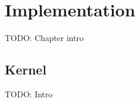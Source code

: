 \chapter{Implementation}\label{chap:impl}
TODO: Chapter intro





\section{Kernel}
TODO: Intro










